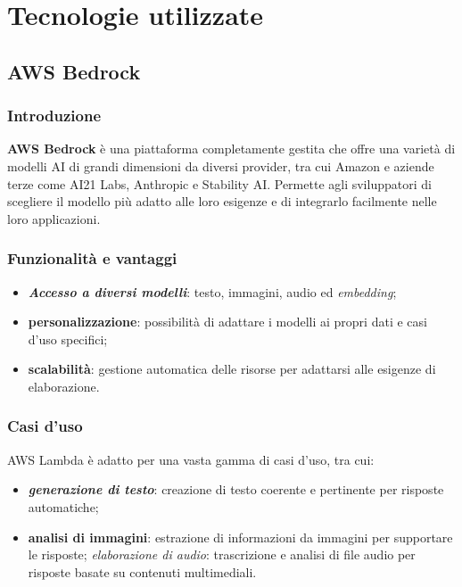 \section{Tecnologie utilizzate}

\subsection{AWS Bedrock}

\subsubsection{Introduzione}
\textbf{AWS Bedrock} è una piattaforma completamente gestita che offre una varietà di modelli AI di grandi dimensioni da diversi provider, tra cui Amazon e aziende terze come AI21 Labs, Anthropic e Stability AI. Permette agli sviluppatori di scegliere il modello più adatto alle loro esigenze e di integrarlo facilmente nelle loro applicazioni.

\subsubsection{Funzionalità e vantaggi}
\begin{itemize}
    \item \textbf{\textit{Accesso a diversi modelli}}: testo, immagini, audio ed \textit{embedding};
    \item \textbf{personalizzazione}: possibilità di adattare i modelli ai propri dati e casi d’uso specifici;
    \item \textbf{scalabilità}: gestione automatica delle risorse per adattarsi alle esigenze di elaborazione.
\end{itemize}

\subsubsection{Casi d'uso}
AWS Lambda è adatto per una vasta gamma di casi d’uso, tra cui:
\begin{itemize}
    \item \textbf{\textit{generazione di testo}}: creazione di testo coerente e pertinente per risposte automatiche;
    \item \textbf{analisi di immagini}: estrazione di informazioni da immagini per supportare le risposte;
    \textit{elaborazione di audio}: trascrizione e analisi di file audio per risposte basate su contenuti multimediali.
\end{itemize}

